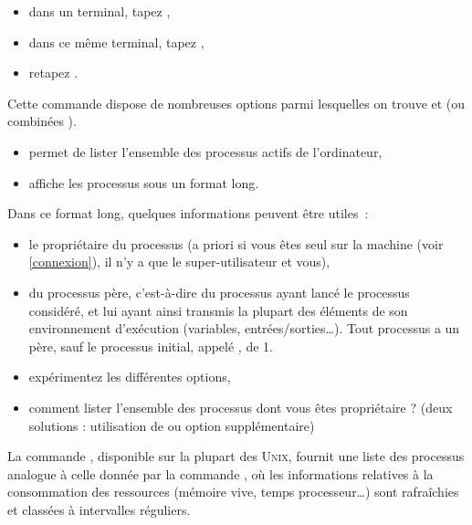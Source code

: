 \documentclass[11pt,a4paper]{article}
\newcommand{\unix}{\textsc{Unix}}
\begin{document}
\begin{maw}
\begin{itemize}
  \item dans un terminal, tapez ,
  \item dans ce même terminal, tapez ,
  \item retapez .
\end{itemize}
\end{maw}

Cette commande  dispose de nombreuses options parmi lesquelles on
trouve  et  (ou combinées ).

\begin{itemize}
  \item {} permet de lister l'ensemble des processus actifs de
        l'ordinateur,
  \item {} affiche les processus sous un format long.
\end{itemize}

Dans ce format long, quelques informations peuvent être utiles~:

\begin{itemize}
  \item le propriétaire du processus (a priori si vous êtes seul sur la
        machine (voir \ref{connexion}), il n'y a que le super-utilisateur
         et vous),
  \item {} du processus père, c'est-à-dire du processus ayant lancé le
        processus considéré, et lui ayant ainsi transmis la plupart des
        éléments de son environnement d'exécution (variables,
        entrées/sorties\ldots). Tout processus a un père, sauf le processus
        initial, appelé , de  1.
\end{itemize}
 
\begin{maw}
\begin{itemize}
  \item expérimentez les différentes options,
  \item comment lister l'ensemble des processus dont vous êtes propriétaire ?
        (deux solutions : utilisation de  ou option supplémentaire)
\end{itemize}
\end{maw}

La commande , disponible sur la plupart des \unix, fournit une liste
des processus analogue à celle donnée par la commande , où les
informations relatives à la consommation des ressources (mémoire vive, temps
processeur\ldots) sont rafraîchies et classées à intervalles réguliers.
\end{document}
